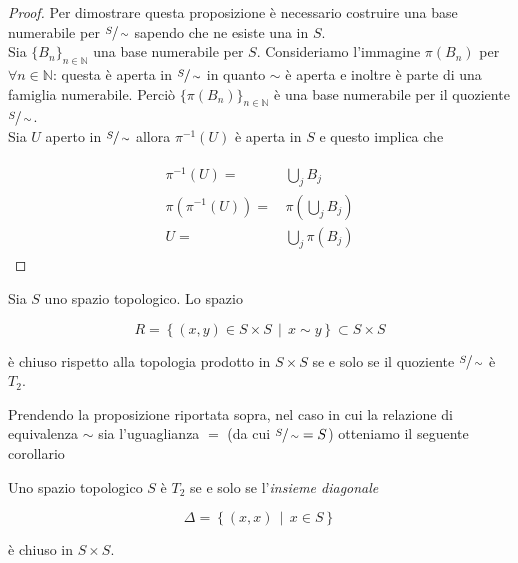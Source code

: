 \begin{proof}\label{solved-es2-4}
	Per dimostrare questa proposizione è necessario costruire una base numerabile per $ \sfrac{S}{\sim} $ sapendo che ne esiste una in $ S $.\\
	Sia $ \{B_{n}\}_{n \in \mathbb{N}} $ una base numerabile per $ S $. Consideriamo l'immagine $ \pi(B_{n}) $ per $ \forall n \in \mathbb{N} $: questa è aperta in $ \sfrac{S}{\sim} $ in quanto $ \sim $ è aperta e inoltre è parte di una famiglia numerabile. Perciò $ \{\pi(B_{n})\}_{n \in \mathbb{N}} $ è una base numerabile per il quoziente $ \sfrac{S}{\sim} $.\\
	Sia $ U $ aperto in $ \sfrac{S}{\sim} $ allora $ \pi^{-1}(U) $ è aperta in $ S $ e questo implica che
	
	\begin{align}
		\begin{split}
			\pi^{-1}(U) =& \, \bigcup_{j} B_{j}\\
			\pi(\pi^{-1}(U)) =& \, \pi \left( \bigcup_{j} B_{j} \right)\\
			U =& \, \bigcup_{j} \pi(B_{j})
		\end{split}
	\end{align}
\end{proof}

\begin{definition}\label{prop-t2}
	Sia $ S $ uno spazio topologico. Lo spazio
	
	\begin{equation}
		R = \left\{ (x,y) \in S \times S \, \middle| \, x \sim y \right\} \subset S \times S
	\end{equation}

	è chiuso rispetto alla topologia prodotto in $ S \times S $ se e solo se il quoziente $ \sfrac{S}{\sim} $ è $ T_{2} $.
\end{definition}

Prendendo la proposizione riportata sopra, nel caso in cui la relazione di equivalenza $ \sim $ sia l'uguaglianza $ = $ (da cui $ \sfrac{S}{\sim} = S $) otteniamo il seguente corollario

\begin{corollary}
	Uno spazio topologico $ S $ è $ T_{2} $ se e solo se l'\textit{insieme diagonale}
	
	\begin{equation}
		\Delta = \left\{ (x,x) \, \middle| \, x \in S \right\}
	\end{equation}

	è chiuso in $ S \times S $.
\end{corollary}

